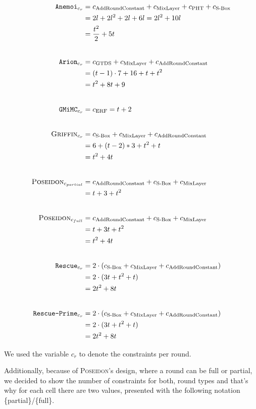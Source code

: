 \documentclass[12pt, a4paper]{report}
\begin{document}
\begin{align*}
  \texttt{Anemoi}_{c_r} & = c_{\text{AddRoundConstant}} + c_{\text{MixLayer}} + c_{\text{PHT}} + c_{\text{S-Box}} \\
    &= 2l + 2l^2 + 2l + 6l = 2l^2 + 10l \\
    &= \frac{t^2}{2} + 5t\\[20pt]
  \texttt{Arion}_{c_r} &= c_{\text{GTDS}} + c_{\text{MixLayer}} + c_{\text{AddRoundConstant}} \\
    &= (t-1) \cdot 7 + 16 + t + t^2 \\
    &= t^2 + 8t + 9\\[20pt]
  \texttt{GMiMC}_{c_r} &= c_{\text{ERF}} = t+2\\[20pt]
  \textsc{Griffin}_{c_r} &= c_{\text{S-Box}} + c_{\text{MixLayer}} + c_{\text{AddRoundConstant}} \\
    & = 6 + (t-2)*3 + t^2 + t \\
    & = t^2 + 4t\\[20pt]
  \textsc{Poseidon}_{c_{partial}} &= c_{\text{AddRoundConstant}} + c_{\text{S-Box}} + c_{\text{MixLayer}} \\
    &= t + 3 + t^2\\[20pt]
  \textsc{Poseidon}_{c_{full}} &= c_{\text{AddRoundConstant}} + c_{\text{S-Box}} + c_{\text{MixLayer}} \\ 
    &= t + 3t + t^2 \\
    &= t^2 + 4t\\[20pt]
  \texttt{Rescue}_{c_r} &= 2 \cdot (c_{\text{S-Box}} + c_{\text{MixLayer}} + c_{\text{AddRoundConstant}}) \\
    &= 2 \cdot (3t + t^2 + t) \\
    &= 2t^2 + 8t\\[20pt]
  \texttt{Rescue-Prime}_{c_r} &= 2 \cdot (c_{\text{S-Box}} + c_{\text{MixLayer}} + c_{\text{AddRoundConstant}}) \\
    &= 2 \cdot (3t + t^2 + t) \\
    &= 2t^2 + 8t
\end{align*}

We used the variable $c_r$ to denote the constraints per round.

Additionally, because of \textsc{Poseidon}'s design, where a round can be full or partial, we decided to show the number of constraints for both, round types and that's why for each cell there are two values, presented with the following notation \{partial\}/\{full\}.
\end{document}
